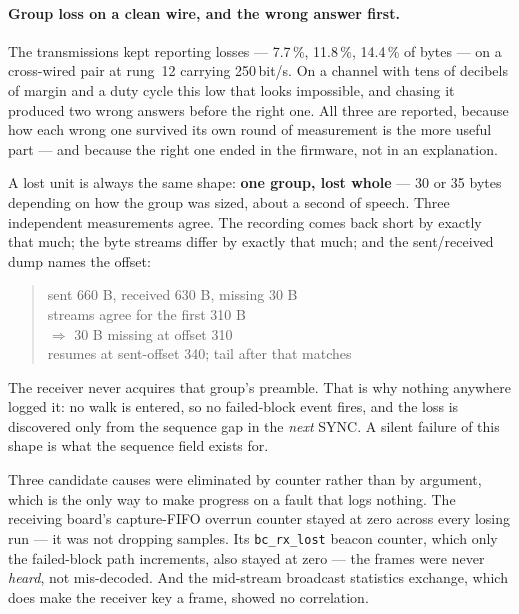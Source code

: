 \paragraph{Group loss on a clean wire, and the wrong answer first.}
The transmissions kept reporting losses --- 7.7\,\%, 11.8\,\%,
14.4\,\% of bytes --- on a cross-wired pair at rung~12 carrying
250\,bit/s.  On a channel with tens of decibels of margin and a duty
cycle this low that looks impossible, and chasing it produced two
wrong answers before the right one.  All three are reported, because
how each wrong one survived its own round of measurement is the more
useful part --- and because the right one ended in the firmware, not
in an explanation.

A lost unit is always the same shape: \textbf{one group, lost whole}
--- 30 or 35 bytes depending on how the group was sized, about a
second of speech.  Three independent measurements agree.  The recording
comes back short by exactly that much; the byte streams differ by
exactly that much; and the sent/received dump names the offset:

\begin{quote}\ttfamily\small
sent 660 B, received 630 B, missing 30 B\\
streams agree for the first 310 B\\
$\Rightarrow$ 30 B missing at offset 310\\
\hphantom{$\Rightarrow$} resumes at sent-offset 340; tail after that matches
\end{quote}

\noindent
The receiver never acquires that group's preamble.  That is why nothing
anywhere logged it: no walk is entered, so no failed-block event fires,
and the loss is discovered only from the sequence gap in the \emph{next}
SYNC\@.  A silent failure of this shape is what the sequence field
exists for.

Three candidate causes were eliminated by counter rather than by
argument, which is the only way to make progress on a fault that logs
nothing.  The receiving board's capture-FIFO overrun counter stayed at
zero across every losing run --- it was not dropping samples.  Its
\texttt{bc\_rx\_lost} beacon counter, which only the failed-block path
increments, also stayed at zero --- the frames were never \emph{heard},
not mis-decoded.  And the mid-stream broadcast statistics exchange,
which does make the receiver key a frame, showed no correlation.


